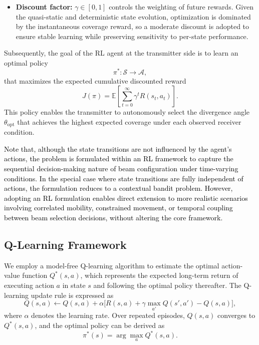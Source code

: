 \documentclass[twocolumn,twoside]{IEEEtran}
\theoremstyle{break}
\begin{document}
\begin{itemize}
	
	\item \textbf{Discount factor:} $\gamma \in [0,1]$ controls the weighting of future rewards. Given the quasi-static and deterministic state evolution, optimization is dominated by the instantaneous coverage reward, so a moderate discount is adopted to ensure stable learning while preserving sensitivity to per-state performance.
	
	
\end{itemize}

Subsequently, the goal of the RL agent at the transmitter side is to learn an optimal policy
\begin{equation}
	\pi^{*}: \mathcal{S} \rightarrow \mathcal{A},
\end{equation}
that maximizes the expected cumulative discounted reward
\begin{equation}
	J(\pi) = \mathbb{E}\!\left[\sum_{t=0}^{\infty} \gamma^{t} R(s_t, a_t)\right].
\end{equation}
This policy enables the transmitter to autonomously select the divergence angle $\theta_{\text{opt}}$ that achieves the highest expected coverage under each observed receiver condition. 

\textcolor{black}{Note that, although the state transitions are not influenced by the agent’s actions, the problem is formulated within an RL framework to capture the sequential decision-making nature of beam configuration under time-varying conditions. In the special case where state transitions are fully independent of actions, the formulation reduces to a contextual bandit problem. However, adopting an RL formulation enables direct extension to more realistic scenarios involving correlated mobility, constrained movement, or temporal coupling between beam selection decisions, without altering the core framework.}

\subsection{Q-Learning Framework}

We employ a model-free Q-learning algorithm to estimate the optimal action-value function $Q^{*}(s, a)$, which represents the expected long-term return of executing action $a$ in state $s$ and following the optimal policy thereafter. The Q-learning update rule is expressed as \cite{Q-learning}
\begin{equation}
	Q(s,a) \leftarrow Q(s,a) + \alpha \big[ R(s,a) + \gamma \max_{a'} Q(s',a') - Q(s,a) \big],
	\label{eq:q_update}
\end{equation}
where $\alpha$ denotes the learning rate. Over repeated episodes, $Q(s,a)$ converges to $Q^{*}(s,a)$, and the optimal policy can be derived as
\begin{equation}
	\pi^{*}(s) = \arg\max_{a} Q^{*}(s,a).
\end{equation}
\end{document}
